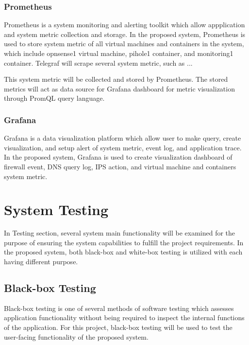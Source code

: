 \documentclass[../index.tex]{subfiles}
\begin{document}
\subsubsection{Prometheus}

Prometheus is a system monitoring and alerting toolkit which allow appplication and system metric
collection and storage. In the proposed system, Prometheus is used to store system metric of all
virtual machines and containers in the system, which include opnsense1 virtual machine, pihole1
container, and monitoring1 container. Telegraf will scrape several system metric, such as ...

This system metric  will be collected and stored by Prometheus. The stored metrics will act as data
source for Grafana dashboard for metric visualization through PromQL query language.

\subsubsection{Grafana}

Grafana is a data visualization platform which allow user to make query, create visualization, and
setup alert of system metric, event log, and application trace. In the proposed system, Grafana is
used to create visualization dashboard of firewall event, DNS query log, IPS action, and virtual
machine and containers system metric.

\section{System Testing}

In Testing section, several system main functionality will be examined for the purpose of ensuring
the system capabilities to fulfill the project requirements. In the proposed system, both black-box
and white-box testing is utilized with each having different purpose.

\subsection{Black-box Testing}

Black-box testing is one of several methods of software testing which assesses application
functionality without being required to inspect the internal functions of the application. For this
project, black-box testing will be used to test the user-facing functionality of the proposed
system.
\end{document}
